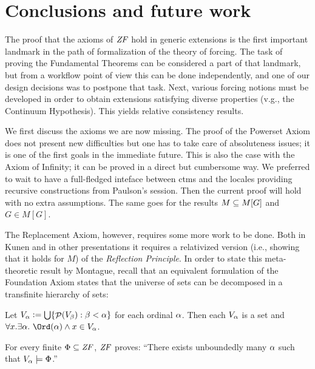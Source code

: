 \section{Conclusions and future work}
\label{sec:conclusions-future-work}

The proof that the axioms of $\mathit{ZF}$ hold in generic extensions is 
the first important landmark in the path of formalization of the
theory of forcing. The task of proving the Fundamental Theorems can be
considered a part of that landmark, but from a workflow point of view
this can be done independently, and one of our design decisions was to
postpone that task.  Next, various forcing notions must be developed
in order to obtain extensions satisfying diverse properties (v.g., the
Continuum Hypothesis). This yields relative consistency results.

We first discuss the axioms we are now missing. The proof of the
Powerset Axiom does not present new difficulties but one  has to
take care of absoluteness issues; it is one of the
first goals in the immediate future. This is also the case with the
Axiom of Infinity; it can be proved in a direct but cumbersome way. We
preferred to wait to have a full-fledged inteface between ctms and the
locales providing recursive constructions from Paulson's
 session. Then the current proof will hold
with no extra assumptions. The same goes for the results $M\subseteq M[G]$
and $G\in M[G]$.

The Replacement Axiom, however, requires some more work to be
done. Both in Kunen and in other presentations \cite{neeman-course}
it requires a relativized version (i.e., showing that it holds for $M$) of
the \emph{Reflection Principle}. In order to state this meta-theoretic
result by Montague, recall that
an equivalent formulation of the Foundation Axiom states that the 
universe of sets can be decomposed in a transfinite hierarchy of
sets: 
\begin{theorem}
  Let $V_{\alpha}\mathrel{\mathop:}=\mathop{\textstyle\bigcup}\{\mathop{\mathcal{P}}(V_\beta) : \beta<\alpha\}$ for each ordinal
  $\alpha$. Then each $V_\alpha$ is a set and 
  $\forall x. \exists\al .\ \Ord(\al) \y x\in V_\al$.  
\end{theorem}
\begin{theorem}\label{th:reflection-principle}
  For every finite $\Phi\subseteq\mathit{ZF}$, $\mathit{ZF}$ proves: ``There exists
  unboundedly many $\alpha$ such that $V_\alpha\models \Phi$.''
\end{theorem}

